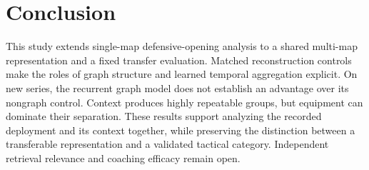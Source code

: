 \section{Conclusion}
This study extends single-map defensive-opening analysis to a shared multi-map representation and a fixed transfer evaluation. Matched reconstruction controls make the roles of graph structure and learned temporal aggregation explicit. On new series, the recurrent graph model does not establish an advantage over its nongraph control. Context produces highly repeatable groups, but equipment can dominate their separation. These results support analyzing the recorded deployment and its context together, while preserving the distinction between a transferable representation and a validated tactical category. Independent retrieval relevance and coaching efficacy remain open. %

\FloatBarrier



